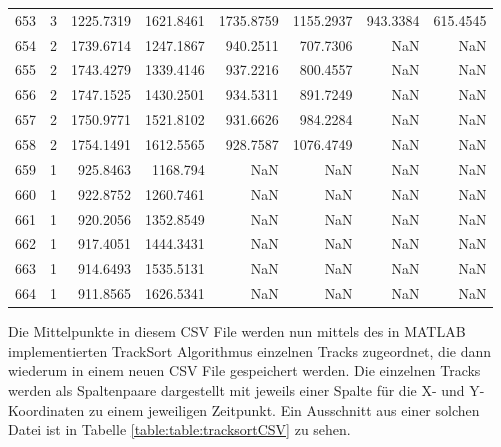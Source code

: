 \begin{table}[]
\begin{tabular}{@{}rcrrrrrr@{}}
    653     & 3    & 1225.7319 & 1621.8461 & 1735.8759 & 1155.2937 & 943.3384 & 615.4545 \\
    654     & 2    & 1739.6714 & 1247.1867 & 940.2511  & 707.7306  & NaN      & NaN      \\
    655     & 2    & 1743.4279 & 1339.4146 & 937.2216  & 800.4557  & NaN      & NaN      \\
    656     & 2    & 1747.1525 & 1430.2501 & 934.5311  & 891.7249  & NaN      & NaN      \\
    657     & 2    & 1750.9771 & 1521.8102 & 931.6626  & 984.2284  & NaN      & NaN      \\
    658     & 2    & 1754.1491 & 1612.5565 & 928.7587  & 1076.4749 & NaN      & NaN      \\
    659     & 1    & 925.8463  & 1168.794  & NaN       & NaN       & NaN      & NaN      \\
    660     & 1    & 922.8752  & 1260.7461 & NaN       & NaN       & NaN      & NaN      \\
    661     & 1    & 920.2056  & 1352.8549 & NaN       & NaN       & NaN      & NaN      \\
    662     & 1    & 917.4051  & 1444.3431 & NaN       & NaN       & NaN      & NaN      \\
    663     & 1    & 914.6493  & 1535.5131 & NaN       & NaN       & NaN      & NaN      \\
    664     & 1    & 911.8565  & 1626.5341 & NaN       & NaN       & NaN      & NaN      \\ \bottomrule
    \end{tabular}
    \normalsize
    
    \label{table:Segmentierungsscript}
    \end{table}
    

Die Mittelpunkte in diesem CSV File werden nun mittels des in MATLAB implementierten TrackSort Algorithmus einzelnen Tracks zugeordnet,
die dann wiederum in einem neuen CSV File gespeichert werden.
Die einzelnen Tracks werden als Spaltenpaare dargestellt mit jeweils einer Spalte für die X- und Y-Koordinaten zu einem jeweiligen Zeitpunkt.
Ein Ausschnitt aus einer solchen Datei ist in Tabelle \ref{table:table:tracksortCSV} zu sehen.



